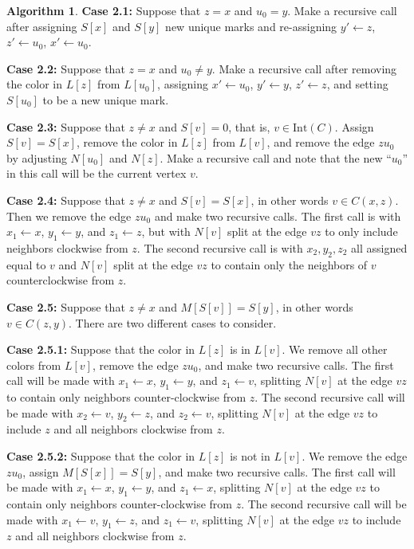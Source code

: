 \documentclass[12pt,letterpaper]{article}
\theoremstyle{plain}
\theoremstyle{definition}
\theoremstyle{break}
\newtheorem{algorithm}[lemma]{Algorithm}     %
\begin{document}
\begin{algorithm}
    \textbf{Case 2.1:} Suppose that $z=x$ and $u_0=y$. Make a recursive
    call after assigning $S[x]$ and $S[y]$ new unique marks and re-assigning
    $y'\leftarrow z$, $z'\leftarrow u_0$, $x'\leftarrow u_0$.

    \textbf{Case 2.2:} Suppose that $z=x$ and $u_0\ne y$. Make a recursive call after
    removing the color in $L[z]$ from $L[u_0]$,
    assigning $x'\leftarrow u_0$,
    $y'\leftarrow y$, $z'\leftarrow z$,
    and setting $S[u_0]$ to be a new unique mark.

    \textbf{Case 2.3:} Suppose that $z\ne x$ and $S[v]=0$, that is, $v\in
    \text{Int}(C)$. Assign $S[v]=S[x]$, remove the color in $L[z]$ from
    $L[v]$, and remove the edge $zu_0$ by adjusting
    $N[u_0]$ and $N[z]$. Make a recursive call and note that the new
    ``$u_0$'' in this call will be the current vertex $v$.

    \textbf{Case 2.4:} Suppose that $z\ne x$ and $S[v]=S[x]$, in other
    words $v\in C(x,z)$. Then we remove
    the edge $zu_0$ and make two
    recursive calls. The first call is with $x_1\leftarrow x$,
    $y_1\leftarrow y$, and $z_1\leftarrow z$, 
    but with $N[v]$ split at the edge $vz$ to only include neighbors clockwise
    from $z$. The second recursive call is 
    with $x_2,y_2,z_2$ all assigned equal to $v$ and $N[v]$ split at the edge
    $vz$ to contain only the neighbors of $v$ counterclockwise from $z$.

    \textbf{Case 2.5:} Suppose that $z\ne x$ and $M[S[v]]=S[y]$, in other words
    $v\in C(z,y)$. There are
    two different cases to consider.

    \textbf{Case 2.5.1:} Suppose that the color in $L[z]$ is in $L[v]$. We
    remove all other colors from $L[v]$, remove the edge $zu_0$, and make two
    recursive calls. The first call will be made with $x_1\leftarrow x$,
    $y_1\leftarrow y$, and $z_1\leftarrow v$, splitting $N[v]$ at the edge
    $vz$ to contain only neighbors counter-clockwise from $z$. The second
    recursive call will be made with $x_2\leftarrow v$, $y_2\leftarrow z$,
    and $z_2\leftarrow v$, splitting $N[v]$ at the edge $vz$ to include $z$
    and all neighbors clockwise from $z$.

    \textbf{Case 2.5.2:} Suppose that the color in $L[z]$ is not in $L[v]$.
    We remove the edge $zu_0$, assign $M[S[x]]=S[y]$, and make two recursive
    calls. The first call
    will be made with $x_1\leftarrow x$,
    $y_1\leftarrow y$, and $z_1\leftarrow x$, splitting $N[v]$ at the edge
    $vz$ to contain only neighbors counter-clockwise from $z$. The second
    recursive call will be made with $x_1\leftarrow v$, $y_1\leftarrow z$,
    and $z_1\leftarrow v$, splitting $N[v]$ at the edge $vz$ to include $z$
    and all neighbors clockwise from $z$.


\end{algorithm}
\end{document}
